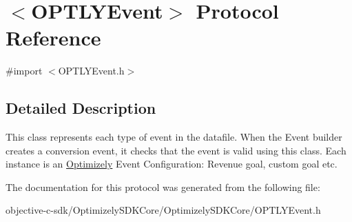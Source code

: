 \hypertarget{protocol_o_p_t_l_y_event-p}{}\section{$<$O\+P\+T\+L\+Y\+Event$>$ Protocol Reference}
\label{protocol_o_p_t_l_y_event-p}


{\ttfamily \#import $<$O\+P\+T\+L\+Y\+Event.\+h$>$}



\subsection{Detailed Description}
This class represents each type of event in the datafile. When the Event builder creates a conversion event, it checks that the event is valid using this class. Each instance is an \mbox{\hyperlink{interface_optimizely}{Optimizely}} Event Configuration\+: Revenue goal, custom goal etc. 

The documentation for this protocol was generated from the following file\+:\begin{DoxyCompactItemize}
\item 
objective-\/c-\/sdk/\+Optimizely\+S\+D\+K\+Core/\+Optimizely\+S\+D\+K\+Core/O\+P\+T\+L\+Y\+Event.\+h\end{DoxyCompactItemize}
